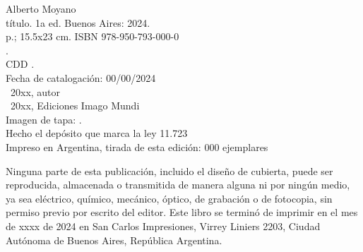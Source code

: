 \noindent Alberto Moyano \\
\noindent título. 1a ed. Buenos Aires: 2024.\\
 p.; 15.5x23 cm. ISBN 978-950-793-000-0 \\
. \\
\noindent CDD .\\
\noindent Fecha de catalogación: 00/00/2024 \\
\noindent \textcopyright~20xx, autor \\
\noindent \textcopyright~20xx, Ediciones Imago Mundi\\
\noindent Imagen de tapa: .\\
\noindent Hecho el depósito que marca la ley 11.723\\
\noindent Impreso en Argentina, tirada de esta edición: 000 ejemplares\\

\vfill

\noindent Ninguna parte de esta publicación, incluido el diseño de cubierta, puede ser reproducida, almacenada o transmitida de manera alguna ni por ningún medio, ya sea eléctrico, químico, mecánico, óptico, de grabación o de fotocopia, sin permiso previo por escrito del editor. Este libro se terminó de imprimir en el mes de xxxx de 2024 en San Carlos Impresiones, Virrey Liniers 2203, Ciudad Autónoma de Buenos Aires, República Argentina.
